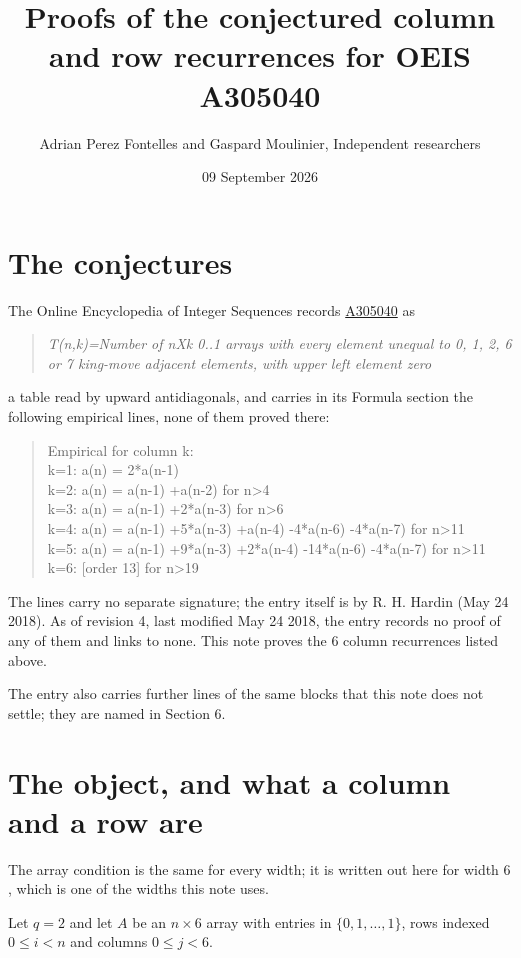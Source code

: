 \documentclass[11pt]{article}
\title{Proofs of the conjectured column and row recurrences for OEIS A305040}
\author{Adrian Perez Fontelles and Gaspard Moulinier, Independent researchers}
\date{09 September 2026}
\theoremstyle{definition}
\begin{document}
\maketitle
\section{The conjectures}

The Online Encyclopedia of Integer Sequences records \href{https://oeis.org/A305040}{A305040} as

\begin{quote}\itshape T(n,k)=Number of nXk 0..1 arrays with every element unequal to 0, 1, 2, 6 or 7 king-move adjacent elements, with upper left element zero\end{quote}

a table read by upward antidiagonals, and carries in its Formula section the following empirical lines, none of them proved there:

\begin{quote}\ttfamily Empirical for column k:\\
k=1: a(n) = 2*a(n-1)\\k=2: a(n) = a(n-1) +a(n-2) for n>4\\k=3: a(n) = a(n-1) +2*a(n-3) for n>6\\k=4: a(n) = a(n-1) +5*a(n-3) +a(n-4) -4*a(n-6) -4*a(n-7) for n>11\\k=5: a(n) = a(n-1) +9*a(n-3) +2*a(n-4) -14*a(n-6) -4*a(n-7) for n>11\\k=6: [order 13] for n>19\end{quote}

The lines carry no separate signature; the entry itself is by R. H. Hardin (May 24 2018). As of revision 4, last modified May 24 2018, the entry records no proof of any of them and links to none. This note proves the 6 column recurrences listed above.

The entry also carries further lines of the same blocks that this note does not settle; they are named in Section 6.

\section{The object, and what a column and a row are}

The array condition is the same for every width; it is written out here for width $6$, which is one of the widths this note uses.

Let $q = 2$ and let $A$ be an $n \times 6$ array with entries in $\{0,1,\dots,1\}$, rows indexed $0 \le i < n$ and columns $0 \le j < 6$.
\end{document}
